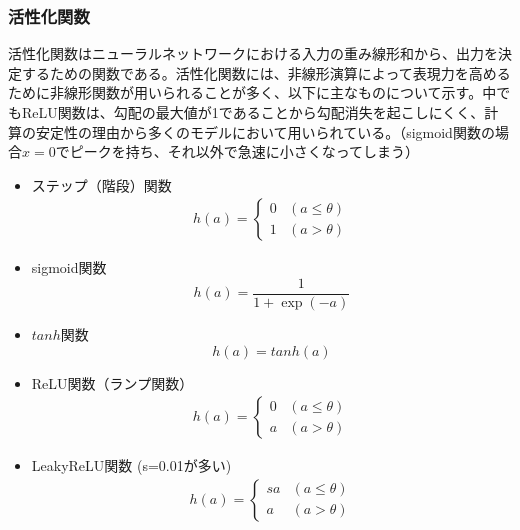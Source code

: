\subsubsection{活性化関数}
活性化関数はニューラルネットワークにおける入力の重み線形和から、出力を決定するための関数である。活性化関数には、非線形演算によって表現力を高めるために非線形関数が用いられることが多く、以下に主なものについて示す。中でもReLU関数は、勾配の最大値が1であることから勾配消失を起こしにくく、計算の安定性の理由から多くのモデルにおいて用いられている。（sigmoid関数の場合$x=0$でピークを持ち、それ以外で急速に小さくなってしまう）
\begin{itemize}
	\item ステップ（階段）関数
		\begin{align}
			h(a) =
			\begin{cases}
			0 & (a \leq \theta)\\
			1 & (a > \theta)
			\end{cases}
		\end{align}
	\item sigmoid関数
		\begin{equation}
			h(a) = \frac{1}{1+\exp(-a)}
		\end{equation}
	\item $tanh$関数
		\begin{equation}
			h(a) = tanh(a)
	\end{equation}
	\item ReLU関数（ランプ関数）
		\begin{align}
			h(a) =
			\begin{cases}
			0 & (a \leq \theta)\\
			a & (a > \theta)
			\end{cases}
		\end{align}
	\item LeakyReLU関数 (s=0.01が多い)
		\begin{align}
			h(a) =
			\begin{cases}
			sa & (a \leq \theta)\\
			a & (a > \theta)
			\end{cases}
		\end{align}
\end{itemize}
